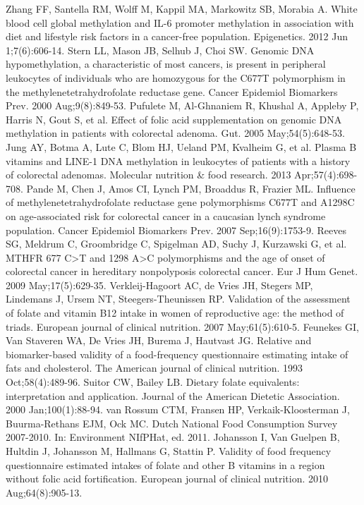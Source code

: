 \begin{thebibliography}{12}
		Zhang FF, Santella RM, Wolff M, Kappil MA, Markowitz SB, Morabia A. White blood cell global methylation and IL-6 promoter methylation in association with diet and lifestyle risk factors in a cancer-free population. Epigenetics. 2012 Jun 1;7(6):606-14.
		Stern LL, Mason JB, Selhub J, Choi SW. Genomic DNA hypomethylation, a characteristic of most cancers, is present in peripheral leukocytes of individuals who are homozygous for the C677T polymorphism in the methylenetetrahydrofolate reductase gene. Cancer Epidemiol Biomarkers Prev. 2000 Aug;9(8):849-53.
		Pufulete M, Al-Ghnaniem R, Khushal A, Appleby P, Harris N, Gout S, et al. Effect of folic acid supplementation on genomic DNA methylation in patients with colorectal adenoma. Gut. 2005 May;54(5):648-53.
		Jung AY, Botma A, Lute C, Blom HJ, Ueland PM, Kvalheim G, et al. Plasma B vitamins and LINE-1 DNA methylation in leukocytes of patients with a history of colorectal adenomas. Molecular nutrition \& food research. 2013 Apr;57(4):698-708.
		Pande M, Chen J, Amos CI, Lynch PM, Broaddus R, Frazier ML. Influence of methylenetetrahydrofolate reductase gene polymorphisms C677T and A1298C on age-associated risk for colorectal cancer in a caucasian lynch syndrome population. Cancer Epidemiol Biomarkers Prev. 2007 Sep;16(9):1753-9.
		Reeves SG, Meldrum C, Groombridge C, Spigelman AD, Suchy J, Kurzawski G, et al. MTHFR 677 C>T and 1298 A>C polymorphisms and the age of onset of colorectal cancer in hereditary nonpolyposis colorectal cancer. Eur J Hum Genet. 2009 May;17(5):629-35.
		Verkleij-Hagoort AC, de Vries JH, Stegers MP, Lindemans J, Ursem NT, Steegers-Theunissen RP. Validation of the assessment of folate and vitamin B12 intake in women of reproductive age: the method of triads. European journal of clinical nutrition. 2007 May;61(5):610-5.
		Feunekes GI, Van Staveren WA, De Vries JH, Burema J, Hautvast JG. Relative and biomarker-based validity of a food-frequency questionnaire estimating intake of fats and cholesterol. The American journal of clinical nutrition. 1993 Oct;58(4):489-96.
		Suitor CW, Bailey LB. Dietary folate equivalents: interpretation and application. Journal of the American Dietetic Association. 2000 Jan;100(1):88-94.
		van Rossum CTM, Fransen HP, Verkaik-Kloosterman J, Buurma-Rethans EJM, Ock MC. Dutch National Food Consumption Survey 2007-2010. In: Environment NIfPHat, ed. 2011.
		Johansson I, Van Guelpen B, Hultdin J, Johansson M, Hallmans G, Stattin P. Validity of food frequency questionnaire estimated intakes of folate and other B vitamins in a region without folic acid fortification. European journal of clinical nutrition. 2010 Aug;64(8):905-13.

\end{thebibliography}
